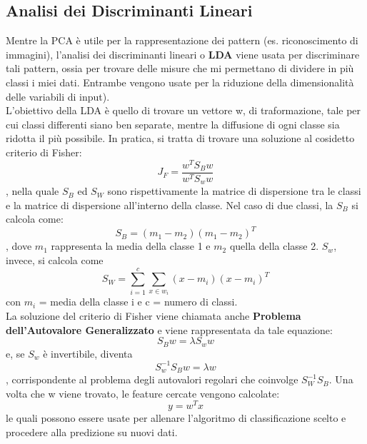 \subsection{Analisi dei Discriminanti Lineari}
Mentre la PCA è utile per la rappresentazione dei pattern (es. riconoscimento di immagini), l'analisi dei discriminanti lineari o \textbf{LDA} viene usata per discriminare tali pattern, ossia per trovare delle misure che mi permettano di dividere in più classi i miei dati. Entrambe vengono usate per la riduzione della dimensionalità delle variabili di input).\\
L'obiettivo della LDA è quello di trovare un vettore w, di traformazione, tale per cui classi differenti siano ben separate, mentre la diffusione di ogni classe sia ridotta il più possibile. In pratica, si tratta di trovare una soluzione al cosidetto criterio di Fisher: \begin{equation} J_F = \dfrac{w^TS_Bw}{w^TS_ww}  \end{equation}, nella quale $S_B$ ed $S_W$ sono rispettivamente la matrice di dispersione tra le classi e la matrice di dispersione all'interno della classe. Nel caso di due classi, la $S_B$ si calcola come: \begin{equation} S_B = (m_1 - m_2)(m_1 - m_2)^T \end{equation}, dove $m_1$ rappresenta la media della classe 1 e $m_2$ quella della classe 2. $S_w$, invece, si calcola come \begin{equation}S_W = \sum_{i=1}^{c} \sum_{x \in w_i}^{} (x - m_i)(x-m_i)^T\end{equation} con $m_i$ = media della classe i e c = numero di classi.\\
La soluzione del criterio di Fisher viene chiamata anche \textbf{Problema dell'Autovalore Generalizzato} e viene rappresentata da tale equazione: \begin{equation}S_Bw=\lambda S_ww\end{equation} e, se $S_w$ è invertibile, diventa \begin{equation}S_w^{-1}S_Bw=\lambda w\end{equation}, corrispondente al problema degli autovalori regolari che coinvolge $S_W^{-1}S_B$. Una volta che w viene trovato, le feature cercate vengono calcolate: \begin{equation}y = w^Tx\end{equation} le quali possono essere usate per allenare l'algoritmo di classificazione scelto e procedere alla predizione su nuovi dati.\\
